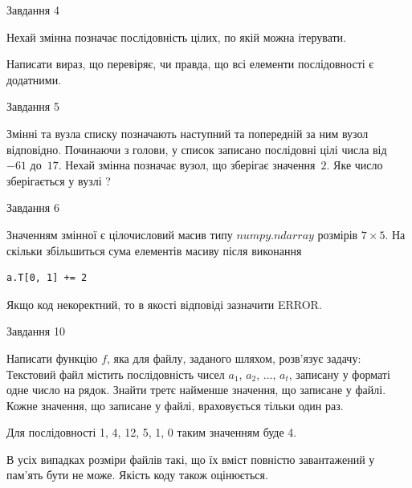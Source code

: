 \documentclass[12pt, ukrainian]{article}
\begin{document}
{               
{\begin{center}Завдання {4}\end{center}}
\vspace{-6mm}
Нехай змінна  позначає послідовність цілих, по якій можна ітерувати.

Написати вираз, що перевіряє, чи правда, що всі елементи послідовності є додатни\-ми.\par

\vspace{10mm}
               
{\begin{center}Завдання {5}\end{center}}
\vspace{-6mm}
Змінні  та  вузла списку позначають наступний та попередній за ним вузол відповідно. Починаючи з голови, у список записано послідовні цілі числа від~$-61$ до~$17$. Нехай змінна  позначає вузол, що зберігає значення~$2$.
Яке число зберігається у вузлі  ?\par

               
{\begin{center}Завдання {6}\end{center}}
\vspace{-6mm}
Значенням змінної  є цілочисловий масив типу $numpy.ndarray$ розмірів $7{\times}5$. На скільки збільшиться сума елементів масиву  після виконання
\begin{verbatim}
a.T[0, 1] += 2
\end{verbatim}


Якщо код некоректний, то в якості відповіді зазначити ERROR.\par

               
{\begin{center}Завдання {10}\end{center}}
\vspace{-6mm}

Написати функцію $f$, яка для файлу, заданого шляхом, розв’язує задачу:\\ Текстовий файл містить послідовність чисел $a_1$, $a_2$, $\ldots$, $a_t$, записану у форматі одне число на рядок. Знайти третє найменше значення, що записане у файлі. Кожне значення, що записане у файлі, враховується тільки один раз. \par
Для послідовності 1, 4, 12, 5, 1, 0 таким значенням буде 4.

В усіх випадках розміри файлів такі, що їх вміст повністю завантажений у пам'ять бути не може. Якість коду також оцінюється.



}
\end{document}
